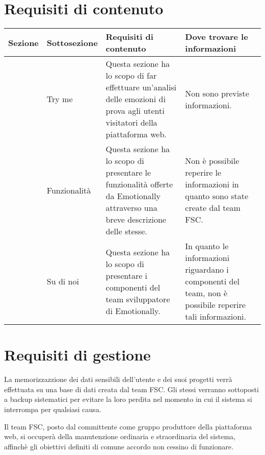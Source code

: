 \section{Requisiti di contenuto}\label{sec:requisiti-di-contenuto}
\begin{table}[H]
	\centering
	\caption{Contenuti di Emotionally.}
	\label{tab:bisogni-utenti}
	\begin{longtable}{@{}|>{\centering\arraybackslash}m{}|m{}|m{}|>{\centering\arraybackslash}m{}|@{}}
		\hline
		\rowcolor{emotionally-color}
		{\color{white} \textbf{Sezione}}   & {\color{white} 
		\textbf{Sottosezione}}     & {\color{white} \textbf{Requisiti di 
		contenuto}} & {\color{white} \textbf{Dove trovare le informazioni}} 
		\\\hline
		\endfirsthead
		\cellcolor{white!0}  & Try me & Questa sezione ha lo scopo di far 
		effettuare un'analisi delle emozioni di prova agli utenti visitatori 
		della piattaforma web. & Non sono previste informazioni. \\
		\cellcolor{white!0}  & Funzionalità & Questa sezione ha lo scopo di 
		presentare 
		le funzionalità offerte da Emotionally attraverso una breve descrizione 
		delle stesse. & Non è possibile reperire le informazioni in quanto sono 
		state create dal team FSC.\\
		\multirow{-2}{*}{Landing page} & Su di noi & Questa sezione ha lo scopo 
		di 
		presentare i componenti del team sviluppatore di Emotionally. & In 
		quanto le informazioni riguardano i componenti del team, non è 
		possibile reperire tali informazioni. \\		
		\hline
	\end{longtable}
\end{table}

\section{Requisiti di gestione}\label{sec:requisiti-di-gestione}
La memorizzazzione dei dati sensibili dell'utente e dei suoi progetti verrà 
effettuata su una base di dati creata dal team FSC. Gli stessi verranno 
sottoposti a backup sistematici per evitare la loro perdita nel momento in cui 
il sistema si interrompa per qualsiasi causa.

Il team FSC, posto dal committente come gruppo produttore della piattaforma 
web, si occuperà della manutenzione ordinaria e straordinaria del sistema, 
affinchè gli obiettivi definiti di comune accordo non cessino di funzionare.

